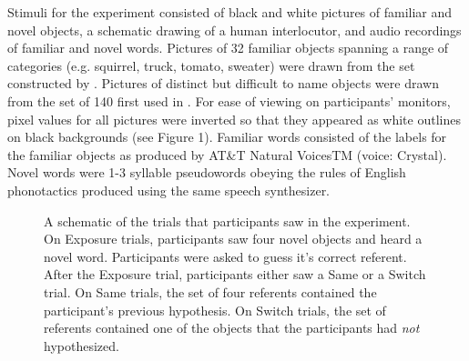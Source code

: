 \documentclass[10pt,letterpaper]{article}
\begin{document}
Stimuli for the experiment consisted of black and white pictures of familiar
and novel objects, a schematic drawing of a human interlocutor, and audio recordings of familiar and novel words. Pictures of 32 familiar objects spanning a range of categories (e.g. squirrel, truck, tomato, sweater) were drawn from the set constructed by . Pictures of distinct but
difficult to name objects were drawn from the set of 140 first used in . For ease of viewing on participants' monitors, pixel values for all pictures were inverted so that they appeared as white outlines on black backgrounds (see Figure 1). Familiar words consisted of the labels for the familiar objects as produced by AT&T Natural VoicesTM (voice: Crystal). Novel words were 1-3 syllable pseudowords obeying the rules of English phonotactics produced using the same speech synthesizer.
%
\begin{figure}
	\centering
	\caption{A schematic of the trials that participants saw in the experiment. On Exposure trials, participants saw four novel objects and heard a novel word. Participants were asked to guess it's correct referent. After the Exposure trial, participants either saw a Same or a Switch trial. On Same trials, the set of four referents contained the participant's previous hypothesis. On Switch trials, the set of referents contained one of the objects that the participants had \emph{not} hypothesized.}
\end{figure}
\end{document}
